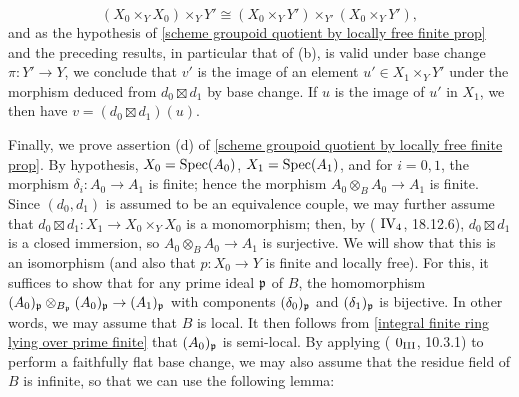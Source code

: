 \[(X_0\times_YX_0)\times_YY'\cong(X_0\times_YY')\times_{Y'}(X_0\times_YY'),\]
and as the hypothesis of \cref{scheme groupoid quotient by locally free finite prop} and the preceding results, in particular that of (b), is valid under base change $\pi:Y'\to Y$, we conclude that $v'$ is the image of an element $u'\in X_1\times_YY'$ under the morphism deduced from $d_0\boxtimes d_1$ by base change. If $u$ is the image of $u'$ in $X_1$, we then have $v=(d_0\boxtimes d_1)(u)$.\par
Finally, we prove assertion (d) of \cref{scheme groupoid quotient by locally free finite prop}. By hypothesis, $X_0=\mathrm{Spec}(A_0)$, $X_1=\mathrm{Spec}(A_1)$, and for $i=0,1$, the morphism $\delta_i:A_0\to A_1$ is finite; hence the morphism $A_0\otimes_BA_0\to A_1$ is finite. Since $(d_0,d_1)$ is assumed to be an equivalence couple, we may further assume that $d_0\boxtimes d_1:X_1\to X_0\times_YX_0$ is a monomorphism; then, by (\cite{EGA4} $\text{\Rmnum{4}}_4$, 18.12.6), $d_0\boxtimes d_1$ is a closed immersion, so $A_0\otimes_BA_0\to A_1$ is surjective. We will show that this is an isomorphism (and also that $p:X_0\to Y$ is finite and locally free). For this, it suffices to show that for any prime ideal $\mathfrak{p}$ of $B$, the homomorphism $(A_0)_{\mathfrak{p}}\otimes_{B_{\mathfrak{p}}}(A_0)_{\mathfrak{p}}\to (A_1)_{\mathfrak{p}}$ with components $(\delta_0)_{\mathfrak{p}}$ and $(\delta_1)_{\mathfrak{p}}$ is bijective. In other words, we may assume that $B$ is local. It then follows from \cref{integral finite ring lying over prime finite} that $(A_0)_{\mathfrak{p}}$ is semi-local. By applying (\cite{EGA3} $0_{\text{\Rmnum{3}}}$, 10.3.1) to perform a faithfully flat base change, we may also assume that the residue field of $B$ is infinite, so that we can use the following lemma:

